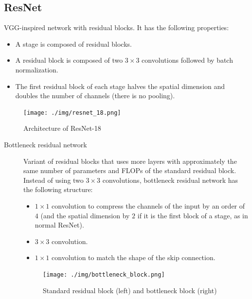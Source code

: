 \subsection{ResNet}

VGG-inspired network with residual blocks.
It has the following properties:\\
\begin{minipage}{0.48\linewidth}
    \begin{itemize}
        \item A stage is composed of residual blocks.
        \item A residual block is composed of two $3 \times 3$ convolutions followed by batch normalization.
        \item The first residual block of each stage halves the spatial dimension and doubles the number of channels (there is no pooling).
    \end{itemize}
\end{minipage}
\hfill
\begin{minipage}{0.45\linewidth}
    \begin{figure}[H]
        \centering
        \texttt{[image: ./img/resnet\_18.png]}
        \caption{Architecture of ResNet-18}
    \end{figure}
\end{minipage}


\begin{description}
    \item[Bottleneck residual network] 
        Variant of residual blocks that uses more layers with approximately the same number of parameters and FLOPs of the standard residual block.
        Instead of using two $3 \times 3$ convolutions, bottleneck residual network has the following structure:
        \begin{itemize}
            \item $1 \times 1$ convolution to compress the channels of the input by an order of $4$ (and the spatial dimension by $2$ if it is the first block of a stage, as in normal ResNet).
            \item $3 \times 3$ convolution.
            \item $1 \times 1$ convolution to match the shape of the skip connection.
        \end{itemize}

        \begin{figure}[H]
            \centering
            \texttt{[image: ./img/bottleneck\_block.png]}
            \caption{Standard residual block (left) and bottleneck block (right)}
        \end{figure}
\end{description}


